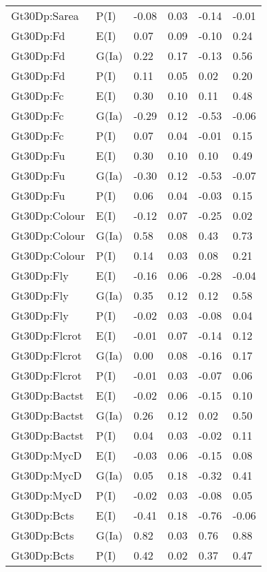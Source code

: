 \begin{center}
\begin{longtable}{|p{1.1in}|p{0.7in}|p{0.7in}|p{0.6in}|p{0.6in}|p{0.6in}|}
  Gt30Dp:Sarea & P(I) & -0.08 & 0.03 & -0.14 & -0.01 \\ 
  Gt30Dp:Fd & E(I) & 0.07 & 0.09 & -0.10 & 0.24 \\ 
  Gt30Dp:Fd & G(Ia) & 0.22 & 0.17 & -0.13 & 0.56 \\ 
  Gt30Dp:Fd & P(I) & 0.11 & 0.05 & 0.02 & 0.20 \\ 
  Gt30Dp:Fc & E(I) & 0.30 & 0.10 & 0.11 & 0.48 \\ 
  Gt30Dp:Fc & G(Ia) & -0.29 & 0.12 & -0.53 & -0.06 \\ 
  Gt30Dp:Fc & P(I) & 0.07 & 0.04 & -0.01 & 0.15 \\ 
  Gt30Dp:Fu & E(I) & 0.30 & 0.10 & 0.10 & 0.49 \\ 
  Gt30Dp:Fu & G(Ia) & -0.30 & 0.12 & -0.53 & -0.07 \\ 
  Gt30Dp:Fu & P(I) & 0.06 & 0.04 & -0.03 & 0.15 \\ 
  Gt30Dp:Colour & E(I) & -0.12 & 0.07 & -0.25 & 0.02 \\ 
  Gt30Dp:Colour & G(Ia) & 0.58 & 0.08 & 0.43 & 0.73 \\ 
  Gt30Dp:Colour & P(I) & 0.14 & 0.03 & 0.08 & 0.21 \\ 
  Gt30Dp:Fly & E(I) & -0.16 & 0.06 & -0.28 & -0.04 \\ 
  Gt30Dp:Fly & G(Ia) & 0.35 & 0.12 & 0.12 & 0.58 \\ 
  Gt30Dp:Fly & P(I) & -0.02 & 0.03 & -0.08 & 0.04 \\ 
  Gt30Dp:Flcrot & E(I) & -0.01 & 0.07 & -0.14 & 0.12 \\ 
  Gt30Dp:Flcrot & G(Ia) & 0.00 & 0.08 & -0.16 & 0.17 \\ 
  Gt30Dp:Flcrot & P(I) & -0.01 & 0.03 & -0.07 & 0.06 \\ 
  Gt30Dp:Bactst & E(I) & -0.02 & 0.06 & -0.15 & 0.10 \\ 
  Gt30Dp:Bactst & G(Ia) & 0.26 & 0.12 & 0.02 & 0.50 \\ 
  Gt30Dp:Bactst & P(I) & 0.04 & 0.03 & -0.02 & 0.11 \\ 
  Gt30Dp:MycD & E(I) & -0.03 & 0.06 & -0.15 & 0.08 \\ 
  Gt30Dp:MycD & G(Ia) & 0.05 & 0.18 & -0.32 & 0.41 \\ 
  Gt30Dp:MycD & P(I) & -0.02 & 0.03 & -0.08 & 0.05 \\ 
  Gt30Dp:Bcts & E(I) & -0.41 & 0.18 & -0.76 & -0.06 \\ 
  Gt30Dp:Bcts & G(Ia) & 0.82 & 0.03 & 0.76 & 0.88 \\ 
  Gt30Dp:Bcts & P(I) & 0.42 & 0.02 & 0.37 & 0.47 \\ 

\end{longtable}
\end{center}
